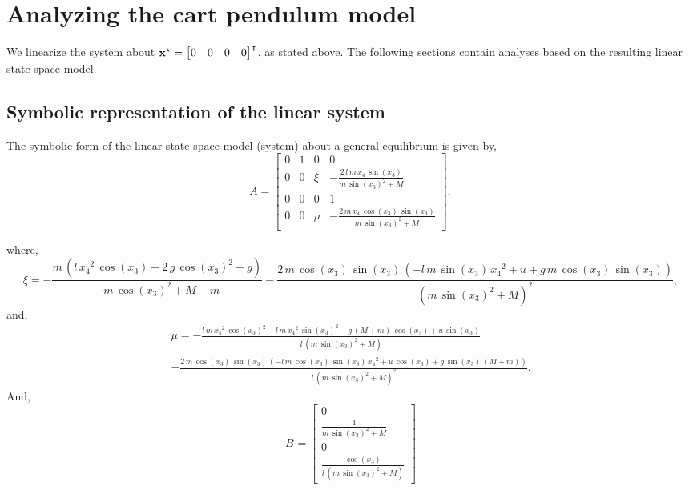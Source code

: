 \documentclass[10pt]{article}
\begin{document}
\section{Analyzing the cart pendulum model}
We linearize the system about $\mathbf{x}^\star = \begin{bmatrix} 0 & 0 & 0 & 0 \end{bmatrix}^\intercal$, as stated above. The following sections contain analyses based on the resulting linear state space model.

\subsection{Symbolic representation of the linear system}
The symbolic form of the linear state-space model (system) about a general equilibrium is given by, 
\begin{equation*}
    A = \begin{bmatrix} 0 & 1 & 0 & 0\\ 0 & 0 & \xi & -\frac{2\,l\,m\,x_{4}\,\sin\left(x_{3}\right)}{m\,{\sin\left(x_{3}\right)}^2+M}\\ 0 & 0 & 0 & 1\\ 0 & 0 & \mu & -\frac{2\,m\,x_{4}\,\cos\left(x_{3}\right)\,\sin\left(x_{3}\right)}{m\,{\sin\left(x_{3}\right)}^2+M} \end{bmatrix},
\end{equation*}

where, 
\begin{equation*}
    \xi = -\frac{m\,\left(l\,{x_{4}}^2\,\cos\left(x_{3}\right)-2\,g\,{\cos\left(x_{3}\right)}^2+g\right)}{-m\,{\cos\left(x_{3}\right)}^2+M+m}-\frac{2\,m\,\cos\left(x_{3}\right)\,\sin\left(x_{3}\right)\,\left(-l\,m\,\sin\left(x_{3}\right)\,{x_{4}}^2+u+g\,m\,\cos\left(x_{3}\right)\,\sin\left(x_{3}\right)\right)}{{\left(m\,{\sin\left(x_{3}\right)}^2+M\right)}^2},
\end{equation*}
and,
\begin{multline*}
    \mu = -\frac{l\,m\,{x_{4}}^2\,{\cos\left(x_{3}\right)}^2-l\,m\,{x_{4}}^2\,{\sin\left(x_{3}\right)}^2-g\,\left(M+m\right)\,\cos\left(x_{3}\right)+u\,\sin\left(x_{3}\right)}{l\,\left(m\,{\sin\left(x_{3}\right)}^2+M\right)} \\ -\frac{2\,m\,\cos\left(x_{3}\right)\,\sin\left(x_{3}\right)\,\left(-l\,m\,\cos\left(x_{3}\right)\,\sin\left(x_{3}\right)\,{x_{4}}^2+u\,\cos\left(x_{3}\right)+g\,\sin\left(x_{3}\right)\,\left(M+m\right)\right)}{l\,{\left(m\,{\sin\left(x_{3}\right)}^2+M\right)}^2}.
\end{multline*}
And, 
\begin{equation*}
    B_\text{} = 
    \begin{bmatrix} 0\\ \frac{1}{m\,{\sin\left(x_{3}\right)}^2+M}\\ 0\\ \frac{\cos\left(x_{3}\right)}{l\,\left(m\,{\sin\left(x_{3}\right)}^2+M\right)} \end{bmatrix}
\end{equation*}
\end{document}
